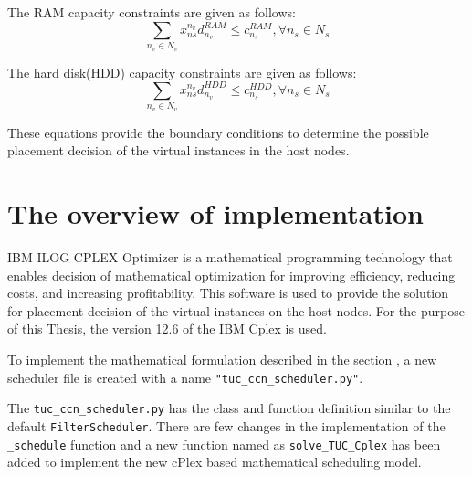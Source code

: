 The RAM capacity constraints are given as follows:
\begin{equation} \label{eq:5}
\sum_{n_v \in N_v}{x_{n s}^{n_v}}{d_{n_v}^{RAM}} \leq c_{n_s}^{RAM}, \forall{n_s} \in N_s 
\end{equation}

The hard disk(HDD) capacity constraints are given as follows:
\begin{equation} \label{eq:6}
\sum_{n_v \in N_v}{x_{n s}^{n_v}}{d_{n_v}^{HDD}} \leq c_{n_s}^{HDD}, \forall{n_s} \in N_s 
\end{equation}

These equations provide the boundary conditions to determine the possible placement decision of the virtual instances in the host nodes.

\section{The overview of implementation}\label{sec:overviewofimplementation}

IBM ILOG CPLEX\textsuperscript{\textregistered} Optimizer is a mathematical programming technology that enables decision of mathematical optimization for improving efficiency, reducing costs, and increasing profitability\cite{cplex-optimizer}.
This software is used to provide the solution for placement decision of the virtual instances on the host nodes.
For the purpose of this Thesis, the version 12.6 of the IBM Cplex is used.

To implement the mathematical formulation described in the section , a new scheduler file is created with a name \verb|"tuc_ccn_scheduler.py"|.

The \verb|tuc_ccn_scheduler.py| has the class and function definition similar to the default \verb|FilterScheduler|.
There are few changes in the implementation of the \verb|_schedule| function and a new function named as \verb|solve_TUC_Cplex| has been added to implement the new cPlex based mathematical scheduling model.

